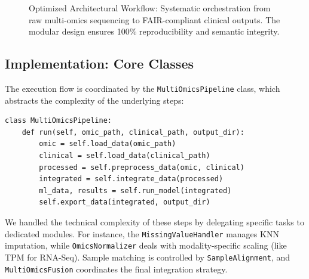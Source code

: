 \documentclass[twocolumn]{article}
\begin{document}
\begin{figure}[!t]
{
}
\caption{Optimized Architectural Workflow: Systematic orchestration from raw multi-omics sequencing to FAIR-compliant clinical outputs. The modular design ensures 100\% reproducibility and semantic integrity.}\label{fig:pipeline_dag}
\end{figure}

\subsection{Implementation: Core Classes}
\noindent The execution flow is coordinated by the \texttt{MultiOmicsPipeline} class, which abstracts the complexity of the underlying steps:

\begin{lstlisting}[caption={Simplified pipeline orchestration snippet.}, label={lst:pipeline}]
class MultiOmicsPipeline:
    def run(self, omic_path, clinical_path, output_dir):
        omic = self.load_data(omic_path)
        clinical = self.load_data(clinical_path)
        processed = self.preprocess_data(omic, clinical)
        integrated = self.integrate_data(processed)
        ml_data, results = self.run_model(integrated)
        self.export_data(integrated, output_dir)
\end{lstlisting}

We handled the technical complexity of these steps by delegating specific tasks to dedicated modules. For instance, the \texttt{MissingValueHandler} manages KNN imputation, while \texttt{OmicsNormalizer} deals with modality-specific scaling (like TPM for RNA-Seq). Sample matching is controlled by \texttt{SampleAlignment}, and \texttt{MultiOmicsFusion} coordinates the final integration strategy.
\end{document}
